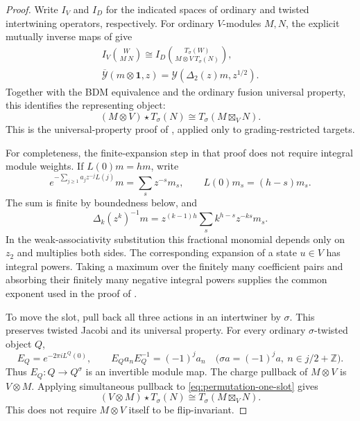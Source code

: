 \begin{proof}
Write $I_V$ and $I_D$ for the indicated spaces of ordinary and twisted
intertwining operators, respectively. For ordinary $V$-modules $M,N$,
the explicit mutually inverse maps of
\cite[Theorems~5.5, 5.9 and Corollary~5.10]{DLXY} give
\[
 \begin{gathered}
 I_V\binom{W}{M\ N}
 \cong I_D\binom{T_\sigma(W)}{M\otimes V\ T_\sigma(N)},\\
 \overline{\mathcal Y}(m\otimes\mathbf1,z)
 =\mathcal Y(\Delta_2(z)m,z^{1/2}).
 \end{gathered}
\]
Together with the BDM equivalence and the ordinary fusion universal
property, this identifies the representing object:
\begin{equation}
 (M\otimes V)\star T_\sigma(N)
 \cong T_\sigma(M\boxtimes_V N).
 \label{eq:permutation-one-slot}
\end{equation}
This is the universal-property proof of
\cite[Theorem~6.3]{DLXY}, applied only to grading-restricted targets.

For completeness, the finite-expansion step in that proof does not
require integral module weights.  If \(L(0)m=hm\), write
\[
 e^{-\sum_{j\ge1}a_jz^{-j}L(j)}m=\sum_s z^{-s}m_s,
 \qquad L(0)m_s=(h-s)m_s.
\]
The sum is finite by boundedness below, and
\[
 \Delta_k(z^k)^{-1}m
 =z^{(k-1)h}\sum_s k^{h-s}z^{-ks}m_s.
\]
In the weak-associativity substitution this fractional monomial
depends only on \(z_2\) and multiplies both sides.
The corresponding expansion of a state \(u\in V\) has integral
powers.  Taking a maximum over the finitely many coefficient pairs
and absorbing their finitely many negative integral powers supplies
the common exponent used in the proof of
\cite[Theorem~5.9]{DLXY}.

To move the slot, pull back all three actions in an intertwiner by
\(\sigma\).  This preserves twisted Jacobi and its universal property.
For every ordinary \(\sigma\)-twisted object \(Q\),
\[
 E_Q=e^{-2\pi iL^Q(0)},\qquad
 E_Qa_nE_Q^{-1}=(-1)^j a_n
 \quad
 \bigl(\sigma a=(-1)^j a,\ n\in j/2+\mathbb Z\bigr).
\]
Thus \(E_Q:Q\longrightarrow Q^\sigma\) is an invertible module map.
The charge pullback of \(M\otimes V\) is \(V\otimes M\).
Applying simultaneous pullback to \eqref{eq:permutation-one-slot} gives
\[
 (V\otimes M)\star T_\sigma(N)
 \cong T_\sigma(M\boxtimes_V N).
\]
This does not require \(M\otimes V\) itself to be flip-invariant.


\end{proof}
